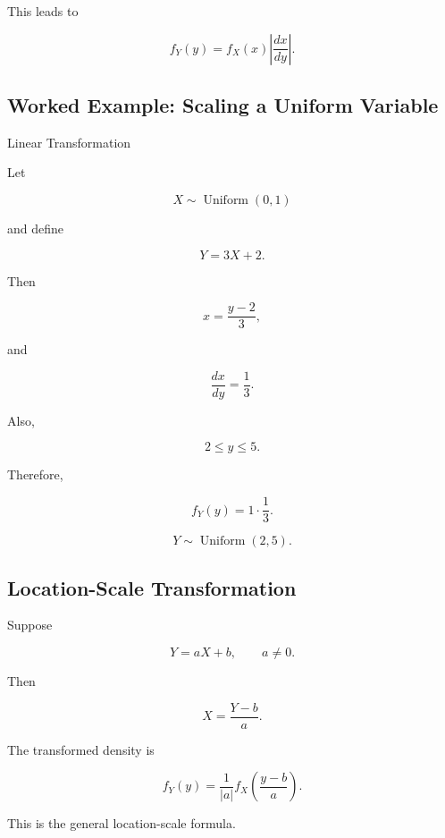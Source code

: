 This leads to

\[
\boxed{
f_Y(y)
=
f_X(x)
\left|
\frac{dx}{dy}
\right|.
}
\]

\subsection{Worked Example: Scaling a Uniform Variable}
\label{subsec:worked-scale-uniform-transform}

\begin{workedexamplebox}{Linear Transformation}

Let

\[
X\sim\operatorname{Uniform}(0,1)
\]

and define

\[
Y=3X+2.
\]

Then

\[
x
=
\frac{y-2}{3},
\]

and

\[
\frac{dx}{dy}
=
\frac13.
\]

Also,

\[
2\leq y\leq5.
\]

Therefore,

\[
f_Y(y)
=
1\cdot\frac13.
\]

\begin{answerbox}
\[
\boxed{
Y\sim\operatorname{Uniform}(2,5).
}
\]
\end{answerbox}

\end{workedexamplebox}

\subsection{Location-Scale Transformation}
\label{subsec:location-scale-transformation}

Suppose

\[
Y=aX+b,
\qquad
a\neq0.
\]

Then

\[
X
=
\frac{Y-b}{a}.
\]

The transformed density is

\[
\boxed{
f_Y(y)
=
\frac1{|a|}
f_X
\left(
\frac{y-b}{a}
\right).
}
\]

This is the general location-scale formula.

